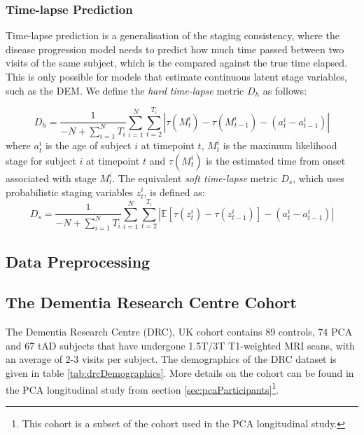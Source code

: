 \subsubsection{Time-lapse Prediction}
\label{sec:timeLapse}

Time-lapse prediction is a generalisation of the staging consistency, where the disease progression model needs to predict how much time passed between two visits of the same subject, which is the compared against the true time elapsed. This is only possible for models that estimate continuous latent stage variables, such as the DEM. We define the \emph{hard time-lapse} metric $D_h$ as follows:

\begin{equation}
D_h = \frac{1}{-N +\sum_{i=1}^N T_i} \sum_{i=1}^N \sum_{t=2}^{T_i} \left| \tau(M^i_t) - \tau(M^i_{t-1}) - (a^i_t - a^i_{t-1}) \right|
\end{equation}
where $a^i_t$ is the age of subject $i$ at timepoint $t$, $M^i_t$ is the maximum likelihood stage for subject $i$ at timepoint $t$ and $\tau(M^i_t)$ is the estimated time from onset associated with stage $M^i_t$. The equivalent \emph{soft time-lapse} metric $D_s$, which uses probabilistic staging variables $z_t^i$, is defined as:
\begin{equation}
D_s = \frac{1}{-N +\sum_{i=1}^N T_i} \sum_{i=1}^N \sum_{t=2}^{T_i} \left| \mathbb{E}[\tau(z^i_t) - \tau(z^i_{t-1})] - (a^i_t - a^i_{t-1}) \right|
\end{equation}

\subsection{Data Preprocessing}

\subsection{The Dementia Research Centre Cohort}
\label{sec:dataPrep}

The Dementia Research Centre (DRC), UK cohort contains 89 controls, 74 PCA and 67 tAD subjects that have undergone 1.5T/3T T1-weighted MRI scans,  with an average of 2-3 visits per subject. The demographics of the DRC dataset is given in table \ref{tab:drcDemographics}. More details on the cohort can be found in the PCA longitudinal study from section \ref{sec:pcaParticipants}\footnote{This cohort is a subset of the cohort used in the PCA longitudinal study.}.

